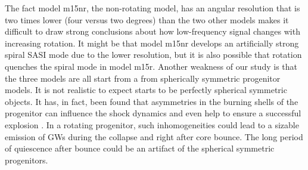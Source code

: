The fact model m15nr, the non-rotating model, has an angular resolution that is two times lower
(four versus two degrees) than the two other models makes it difficult to draw strong conclusions about how low-frequency signal changes with increasing rotation. It might be that model m15nr
develops an artificially strong spiral SASI mode due to the lower resolution, but it is also possible that rotation quenches the spiral mode in model m15r. Another weakness of our study is that the three
models are all start from a from spherically symmetric progenitor models. 
It is not realistic to expect starts to be perfectly spherical symmetric objects.
It has, in fact, been found that asymmetries in the burning shells of the progenitor can influence the shock dynamics and even help to ensure a
successful explosion \citep{burrows_96,fryer_04,arnett_11,couch_13,mueller_15a}. In a rotating progenitor, such inhomogeneities could lead to a sizable emission of GWs
during the collapse and right after core bounce. The long period of quiescence after bounce could be an artifact of the spherical symmetric progenitors.





